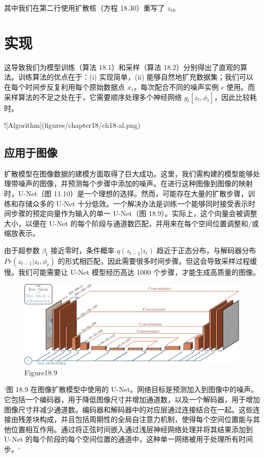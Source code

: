 其中我们在第二行使用扩散核（方程 18.30）重写了 \(z_t\)。

\section{实现}
这导致我们为模型训练（算法 18.1）和采样（算法 18.2）分别得出了直观的算法。训练算法的优点在于：(i) 实现简单，(ii) 能够自然地扩充数据集；我们可以在每个时间步反复利用每个原始数据点 \(x_i\)，每次配合不同的噪声实例 \(\epsilon\) 使用。而采样算法的不足之处在于，它需要顺序处理多个神经网络 \(g_t[z_t,\phi_t]\)，因此比较耗时。


![Algorithm](figures/chapter18/ch18-al.png)

\subsection{应用于图像}
扩散模型在图像数据的建模方面取得了巨大成功。这里，我们需构建的模型能够处理带噪声的图像，并预测每个步骤中添加的噪声。在进行这种图像到图像的映射时，U-Net（图 11.10）是一个理想的选择。然而，可能存在大量的扩散步骤，训练和存储众多的 U-Net 十分低效。一个解决办法是训练一个能够同时接受表示时间步骤的预定向量作为输入的单一 U-Net（图 18.9）。实际上，这个向量会被调整大小，以便在 U-Net 的每个阶段与通道数匹配，并用来在每个空间位置调整和/或缩放表示。

由于超参数 \(\beta_t\) 接近零时，条件概率 \(q(z_{t-1}|z_t)\) 趋近于正态分布，与解码器分布 \(Pr(z_{t-1}|z_t, \phi_t)\) 的形式相匹配，因此需要很多时间步骤。但这会导致采样过程缓慢。我们可能需要让 U-Net 模型经历高达 1000 个步骤，才能生成高质量的图像。

\begin{figure}[h!]
\centering
\includegraphics[width=0.7\linewidth]{png/chapter18/DiffusionUNet.png}
\caption{Figure18.9}
\end{figure}

`图 18.9 在图像扩散模型中使用的 U-Net。网络目标是预测加入到图像中的噪声。它包括一个编码器，用于降低图像尺寸并增加通道数，以及一个解码器，用于增加图像尺寸并减少通道数。编码器和解码器中的对应层通过连接结合在一起。这些连接由残差块构成，并且包括周期性的全局自注意力机制，使得每个空间位置能与其他位置相互作用。通过将正弦时间嵌入通过浅层神经网络处理并将其结果添加到 U-Net 的每个阶段的每个空间位置的通道中，这种单一网络被用于处理所有时间步。`

